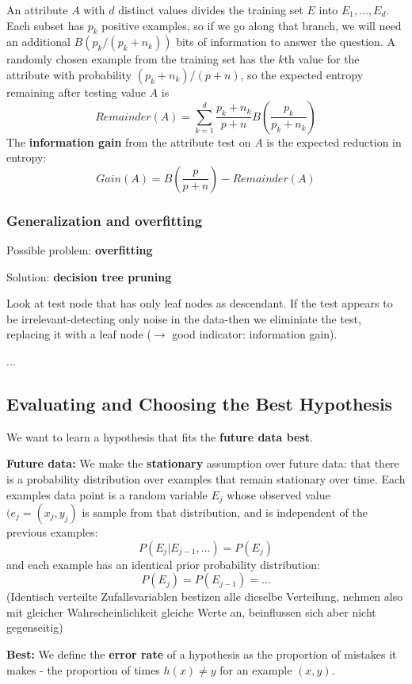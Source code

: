 \documentclass{scrartcl}
\begin{document}
An attribute \(A\) with \(d\) distinct values divides the training set \(E\) into \(E_1, \dots, E_d\). Each subset has \(p_k\) positive examples, so if we go along that branch, we will need an additional \(B(p_k/(p_k+n_k))\) bits of information to answer the question. A randomly chosen example from the training set has the \(k\)th value for the attribute with probability \((p_k + n_k)/(p + n)\), so the expected entropy remaining after testing value \(A\) is
\[Remainder(A) = \sum_{k=1}^d \frac{p_k + n_k}{p+n} B (\frac{p_k}{p_k + n_k})\]
The \textbf{information gain} from the attribute test on \(A\) is the expected reduction in entropy:
\[Gain(A) = B(\frac{p}{p+n}) - Remainder(A)\]

\subsubsection{Generalization and overfitting}
Possible problem: \textbf{overfitting}

Solution: \textbf{decision tree pruning}
        
Look at test node that has only leaf nodes as descendant. If the test appears to be irrelevant-detecting only noise in the data-then we eliminiate the test, replacing it with a leaf node (\(\rightarrow\) good indicator: information gain).

...

\subsection{Evaluating and Choosing the Best Hypothesis}
We want to learn a hypothesis that fits the \textbf{future data best}.

\textbf{Future data:}
We make the \textbf{stationary} assumption over future data: that there is a probability distribution over examples that remain stationary over time. Each examples data point is a random variable \(E_j\) whose observed value \((e_j = (x_j, y_j)\) is sample from that distribution, and is independent of the previous examples:
\[P(E_j | E_{j-1}, \dots) = P(E_j)\] 
and each example has an identical prior probability distribution:
\[P(E_j) = P(E_{j-1}) = \dots\]
(Identisch verteilte Zufallsvariablen bestizen alle dieselbe Verteilung, nehmen also mit gleicher Wahrscheinlichkeit gleiche Werte an, beinflussen sich aber nicht gegenseitig)

\bigbreak

\textbf{Best:} We define the \textbf{error rate} of a hypothesis as the proportion of mistakes it makes - the proportion of times \(h(x) \neq y\) for an example \((x,y)\).
\end{document}
